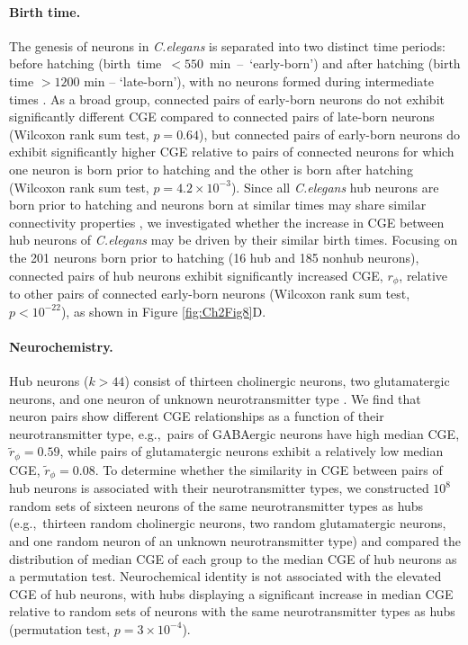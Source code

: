{\paragraph{Birth time.}
The genesis of neurons in \emph{C.elegans} is separated into two distinct time periods: before hatching \mbox{(birth time $<550$ min -- `early-born')} and after hatching (birth time $>1200$ min -- `late-born'), with no neurons formed during intermediate times \citep{Varier2011}.
As a broad group, connected pairs of early-born neurons do not exhibit significantly different CGE compared to connected pairs of late-born neurons (Wilcoxon rank sum test, $p = 0.64$), but connected pairs of early-born neurons do exhibit significantly higher CGE relative to pairs of connected neurons for which one neuron is born prior to hatching and the other is born after hatching (Wilcoxon rank sum test, $p = 4.2 \times 10^{-3}$).
Since all \emph{C.elegans} hub neurons are born prior to hatching \mbox{\citep{Towlson2013}} and neurons born at similar times may share similar connectivity properties \mbox{\citep{Varier2011, Towlson2013}}, we investigated whether the increase in CGE between hub neurons of \emph{C.elegans} may be driven by their similar birth times.
Focusing on the 201 neurons born prior to hatching (16 hub and 185 nonhub neurons), connected pairs of hub neurons exhibit significantly increased CGE, $r_\phi$, relative to other pairs of connected early-born neurons (Wilcoxon rank sum test, $p < 10^{-22}$), as shown in Figure \ref{fig:Ch2Fig8}D.

\paragraph{Neurochemistry.}
Hub neurons ($k > 44$) consist of thirteen cholinergic neurons, two glutamatergic neurons, and one neuron of unknown neurotransmitter type \citep{Pereira2015}.
We find that neuron pairs show different CGE relationships as a function of their neurotransmitter type, \mbox{e.g., pairs} of GABAergic neurons have high median CGE, $\tilde{r}_\phi = 0.59$, while pairs of glutamatergic neurons exhibit a relatively low median CGE, $\tilde{r}_\phi = 0.08$.
To determine whether the similarity in CGE between pairs of hub neurons is associated with their neurotransmitter types, we constructed $10^8$ random sets of sixteen neurons of the same neurotransmitter types as hubs \mbox{(e.g., thirteen} random cholinergic neurons, two random glutamatergic neurons, and one random neuron of an unknown neurotransmitter type) and compared the distribution of median CGE of each group to the median CGE of hub neurons as a permutation test.
Neurochemical identity is not associated with the elevated CGE of hub neurons, with hubs displaying a significant increase in median CGE relative to random sets of neurons with the same neurotransmitter types as hubs (permutation test, $p = 3\times10^{-4}$).

}
